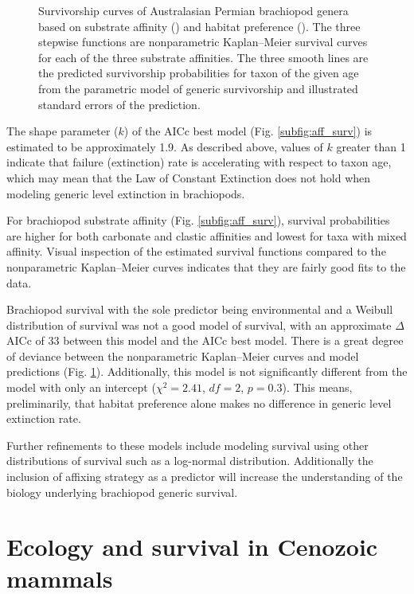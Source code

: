 \documentclass[12pt,letterpaper]{article}
\begin{document}
\begin{figure}[ht]
\begin{subfigure}[b]{0.5\textwidth}
      \label{subfig:env_surv}
    \end{subfigure}
    \caption{Survivorship curves of Australasian Permian brachiopod genera based on substrate affinity () and habitat preference (). The three stepwise functions are nonparametric Kaplan--Meier survival curves for each of the three substrate affinities. The three smooth lines are the predicted survivorship probabilities for taxon of the given age from the parametric model of generic survivorship and illustrated standard errors of the prediction.}
  \label{fig:brach_surv}
\end{figure}

The shape parameter (\(k\)) of the AICc best model (Fig. \ref{subfig:aff_surv}) is estimated to be approximately 1.9. As described above, values of \(k\) greater than 1 indicate that failure (extinction) rate is accelerating with respect to taxon age, which may mean that the Law of Constant Extinction does not hold when modeling generic level extinction in brachiopods.

For brachiopod substrate affinity (Fig. \ref{subfig:aff_surv}), survival probabilities are higher for both carbonate and clastic affinities and lowest for taxa with mixed affinity. Visual inspection of the estimated survival functions compared to the nonparametric Kaplan--Meier curves indicates that they are fairly good fits to the data. 

Brachiopod survival with the sole predictor being environmental and a Weibull distribution of survival was not a good model of survival, with an approximate \(\Delta\)AICc of 33 between this model and the AICc best model. There is a great degree of deviance between the nonparametric Kaplan--Meier curves and model predictions (Fig. \ref{subfig:env_surv}). Additionally, this model is not significantly different from the model with only an intercept (\(\chi^{2} = 2.41\), \(df = 2\), \(p = 0.3\)). This means, preliminarily, that habitat preference alone makes no difference in generic level extinction rate.

Further refinements to these models include modeling survival using other distributions of survival such as a log-normal distribution. Additionally the inclusion of affixing strategy as a predictor will increase the understanding of the biology underlying brachiopod generic survival.


\section{Ecology and survival in Cenozoic mammals}
\end{document}
